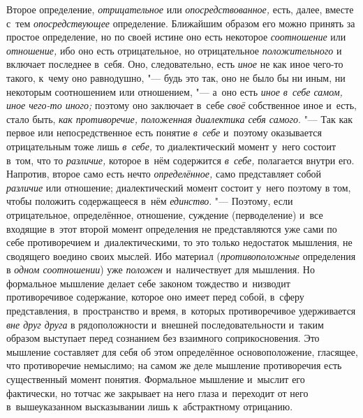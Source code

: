 Второе определение, {\em отрицательное} или
{\em опосредствованное,} есть, далее, вместе с~тем {\em опосредствующее}
определение. Ближайшим образом его можно принять за простое
определение, но по своей истине оно есть некоторое
{\em соотношение} или {\em отношение,} ибо оно
есть отрицательное, но отрицательное {\em положительного} и
включает последнее в~себя. Оно, следовательно, есть {\em иное} не как
иное чего-то такого, к~чему оно равнодушно, "--- будь это
так, оно не было бы ни иным, ни некоторым соотношением или отношением, "---
а~оно есть {\em иное в~себе самом, иное чего-то иного;}
поэтому оно заключает в~себе
{\em своё} собственное иное и~есть, стало быть, {\em как
противоречие, положенная диалектика себя самого}. "--- Так как
первое или непосредственное есть понятие {\em в~себе} и~поэтому
оказывается отрицательным тоже лишь {\em в~себе,} то
диалектический момент у~него состоит в~том, что то
{\em различие,} которое в~нём содержится {\em в~себе,}
полагается внутри его. Напротив, второе само есть нечто
{\em определённое,} само представляет собой {\em различие}
или отношение; диалектический момент состоит у~него поэтому в
том, чтобы положить содержащееся в~нём {\em единство}. "---
Поэтому, если отрицательное, определённое, отношение,
суждение (перводеление) и~все входящие в~этот второй момент определения не
представляются уже сами по себе противоречием и~диалектическими, то это
только недостаток мышления, не сводящего воедино своих мыслей. Ибо материал
({\em противоположные} определения в {\em одном соотношении}) уже
{\em положен} и~наличествует для мышления. Но формальное мышление делает
себе законом тождество и~низводит противоречивое содержание,
которое оно имеет перед собой, в~сферу представления, в~пространство и
время, в~которых противоречивое удерживается {\em вне друг друга} в
рядоположности и~внешней последовательности и~таким образом выступает перед
сознанием без взаимного соприкосновения. Это мышление составляет для себя
об этом определённое основоположение, гласящее, что противоречие немыслимо;
на самом же деле мышление противоречия есть существенный момент понятия.
Формальное мышление и~мыслит его фактически, но тотчас же закрывает на него
глаза и~переходит от него в~вышеуказанном высказывании лишь к~абстрактному
отрицанию.

